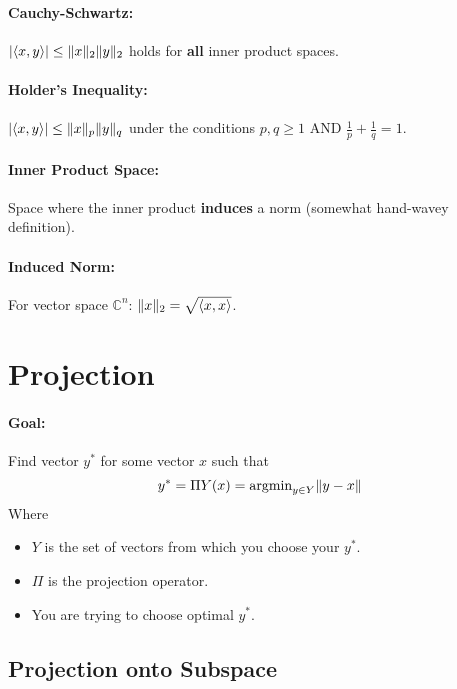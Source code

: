 \documentclass[a4paper,12pt]{report}
\DeclarePairedDelimiter\abs{\lvert}{\rvert}%
\DeclarePairedDelimiter\norm{\lVert}{\rVert}%
\DeclarePairedDelimiter\inpr{\langle}{\rangle}%
\begin{document}
\paragraph{Cauchy-Schwartz: } $\abs{\inpr{x, y}} \leq \norm{x}_2 \norm{y}_2$ holds for \textbf{all} inner product spaces.


\paragraph{Holder's Inequality: } $\abs{\inpr{x, y}} \leq \norm{x}_p \norm{y}_q$ under the conditions $p,q \geq 1$ AND $\frac{1}{p} + \frac{1}{q} = 1$.

\paragraph{Inner Product Space: } Space where the inner product \textbf{induces} a norm (somewhat hand-wavey definition).

\paragraph{Induced Norm: } For vector space $\mathbb{C}^n$: $\norm{x}_2 = \sqrt{\inpr{x,x}}$.



\section{Projection}

\paragraph{Goal: } Find vector $y^*$ for some vector $x$ such that \begin{equation}
y^* = \Pi Y(x) = \text{argmin}_{y\in Y} \norm{y-x}
\end{equation}
Where 
\begin{itemize}
\item $Y$ is the set of vectors from which you choose your $y^*$.
\item $\Pi$ is the projection operator.
\item You are trying to choose optimal $y^*$.
\end{itemize}

\subsection{Projection onto Subspace}
\end{document}
